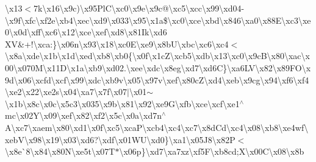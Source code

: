 \begin{DoxyCompactItemize}
\textbackslash{}x13$<$7k\textbackslash{}x16\textbackslash{}x9c)\textbackslash{}x95\+Pl\+C\textbackslash{}xc0\textbackslash{}x9e\textbackslash{}x9c@\textbackslash{}xc5\textbackslash{}xcc\textbackslash{}x99\textbackslash{}xd04-\/\textbackslash{}x9f\textbackslash{}xfc\textbackslash{}xf2e\textbackslash{}xb4\textbackslash{}xec\textbackslash{}xd9\textbackslash{}x033\textbackslash{}x95\textbackslash{}x1a\$\textbackslash{}xc0\textbackslash{}xce\textbackslash{}xbd\textbackslash{}x846\textbackslash{}xa0\textbackslash{}x88\+E\textbackslash{}xc3\textbackslash{}xe0\textbackslash{}x0d\textbackslash{}xff\textbackslash{}xc6\textbackslash{}x12\textbackslash{}xce\textbackslash{}xef\textbackslash{}xd8\textbackslash{}x81\+Ik\textbackslash{}xd6 X\+V\&+!\textbackslash{}xca\+:\}\textbackslash{}x06n\textbackslash{}x93\textbackslash{}x18\textbackslash{}xc0\+E\textbackslash{}xe9\textbackslash{}x8b\+U\textbackslash{}xbc\textbackslash{}xc6\textbackslash{}xc4$<$\textbackslash{}x8a\textbackslash{}xde\textbackslash{}x1b\textbackslash{}x1d\textbackslash{}xed\textbackslash{}xb8\textbackslash{}xb0\{\textbackslash{}x0f\textbackslash{}x1c\+Z\textbackslash{}xcb5\textbackslash{}xdb\textbackslash{}x13\textbackslash{}xc0\textbackslash{}x9c\+B\textbackslash{}x80\textbackslash{}xac\textbackslash{}x00\textbackslash{}x070\+M\textbackslash{}x11\+D\textbackslash{}x1a\textbackslash{}xb9\textbackslash{}xd02.\textbackslash{}xee\textbackslash{}xdc\textbackslash{}x8eg\textbackslash{}xd7\textbackslash{}xd6\+C\}\textbackslash{}xa6\+L\+V\textbackslash{}x82\textbackslash{}x89\+F\+O\textbackslash{}x9d\textbackslash{}x06\textbackslash{}xcfd\textbackslash{}xcf\textbackslash{}x99\textbackslash{}xdc\textbackslash{}xb9v\textbackslash{}x05\textbackslash{}x97v\textbackslash{}xef\textbackslash{}x80c\+Z\textbackslash{}xd4\textbackslash{}xeb\textbackslash{}x9cg\textbackslash{}x94\textbackslash{}xf6\textbackslash{}xf4\textbackslash{}xe2\textbackslash{}x22\textbackslash{}xe2s\textbackslash{}x04\textbackslash{}xa7\textbackslash{}x7f\textbackslash{}x07$\vert$\textbackslash{}x01$\sim$\textbackslash{}x1b\textbackslash{}x8c\textbackslash{}x0c\textbackslash{}x5c3\textbackslash{}x035\textbackslash{}x9b\textbackslash{}x81\textbackslash{}x92\textbackslash{}xe9\+G\textbackslash{}xfb\textbackslash{}xce\textbackslash{}xcf\textbackslash{}xe1$^\wedge$mc\textbackslash{}x02\+Y\textbackslash{}x09\textbackslash{}xef\textbackslash{}x82\textbackslash{}xf2\textbackslash{}x5c\textbackslash{}x0a\textbackslash{}xd7n$^\wedge$\+A\textbackslash{}xc7\textbackslash{}xaem\textbackslash{}x80\textbackslash{}xd1\textbackslash{}x0f\textbackslash{}xc5\textbackslash{}xca\+P\textbackslash{}xcb4\textbackslash{}xc4\textbackslash{}xc7\textbackslash{}x8d\+Cd\textbackslash{}xc4\textbackslash{}x08\textbackslash{}xb8\textbackslash{}xe4wf\textbackslash{}xeb\+V\textbackslash{}x98\textbackslash{}x19\textbackslash{}x03\textbackslash{}xd6?\textbackslash{}xdf\textbackslash{}x01\+W\+U\textbackslash{}xd0\}\textbackslash{}xa1\textbackslash{}x05\+J8\textbackslash{}x82\+P$<$\textbackslash{}x8e\`{}8\textbackslash{}x84\textbackslash{}x80\+N\textbackslash{}xe5t\textbackslash{}x07\+T$\ast$\textbackslash{}x06p\}\textbackslash{}xd7\textbackslash{}xa7xz\textbackslash{}xf5\+F\textbackslash{}xb8cd;\+X\textbackslash{}x00\+C\textbackslash{}x08\textbackslash{}x8b\textquotesingle{}\
\end{DoxyCompactItemize}
